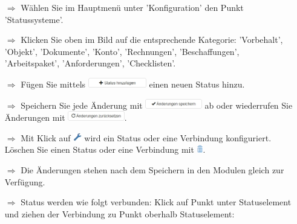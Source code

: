 \documentclass{article}
\begin{document}
\begin{multicols}{2}

\begin{tcolorbox}[colback=blue!5,colframe=blue!40!black,title=Workflows erstellen]
\begin{itemize}
  \item[$\Longrightarrow$] Wählen Sie im Hauptmenü unter 'Konfiguration' den Punkt 'Statussysteme'.
  \item[$\Longrightarrow$] Klicken Sie oben im Bild auf die entsprechende Kategorie: 'Vorbehalt', 'Objekt', 'Dokumente', 'Konto', 'Rechnungen', 'Beschaffungen', 'Arbeitspaket', 'Anforderungen', 'Checklisten'.
  \item[$\Longrightarrow$] Fügen Sie mittels \includegraphics[height=12pt]{Icons/StatusHinzufuegen.png} einen neuen Status hinzu.
  \item[$\Longrightarrow$] Speichern Sie jede Änderung mit \includegraphics[height=12pt]{Icons/AenderungenSpeichern.png} ab oder wiederrufen Sie Änderungen mit \includegraphics[height=12pt]{Icons/AenderungenZuruecksetzen.png}.
	\item[$\Longrightarrow$] Mit Klick auf \includegraphics[height=10pt]{Icons/Schraubenschluessel.png} wird ein Status oder eine Verbindung konfiguriert. Löschen Sie einen Status oder eine Verbindung mit \includegraphics[height=10pt]{Icons/Muelltonne.png}.
	\item[$\Longrightarrow$] Die Änderungen stehen nach dem Speichern in den Modulen gleich zur Verfügung.
\end{itemize}
\end{tcolorbox}


\begin{tcolorbox}[colback=blue!5,colframe=blue!40!black,title=Workflows konfigurieren 1]
\begin{itemize}
  \item[$\Longrightarrow$] Status werden wie folgt verbunden: Klick auf Punkt unter Statuselement und ziehen der Verbindung zu Punkt oberhalb Statuselement:


\end{itemize}
\end{tcolorbox}
\end{multicols}
\end{document}
